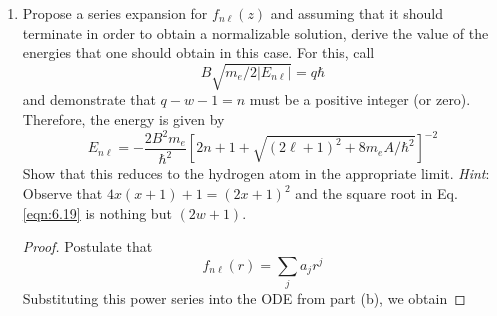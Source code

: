 \documentclass[../psets.tex]{subfiles}
\begin{document}
\begin{enumerate}
\begin{enumerate}
\begin{proof}
\begin{align*}
\begin{split}
                    & -\frac{2m_e}{\hbar^2}\left[ -\frac{B}{r}+\frac{\hbar^2w(w+1)}{2m_er^2}-E_{n\ell} \right]f_{n\ell}(r)
                \end{split}\\
                \begin{split}
                    ={}& f_{n\ell}''(r)+\left[ \frac{2(w+1)}{r}-2k_{n\ell} \right]f_{n\ell}'(r)+\left[ -\frac{2k_{n\ell}(w+1)}{r}+k_{n\ell}^2 \right]f_{n\ell}(r)\\
                    & +\frac{2m_e}{\hbar^2}\left[ \frac{B}{r}+E_{n\ell} \right]f_{n\ell}(r)
                \end{split}\\
                ={}& f_{n\ell}''(r)+2\left[ \frac{w+1}{r}-k_{n\ell} \right]f_{n\ell}'(r)+\left[ \frac{2m_eB}{\hbar^2r}-\frac{2k_{n\ell}(w+1)}{r}+\frac{2m_eE_{n\ell}}{\hbar^2}+k_{n\ell}^2 \right]f_{n\ell}(r)\\
                ={}& f_{n\ell}''(r)+2\left[ \frac{w+1}{r}-k_{n\ell} \right]f_{n\ell}'(r)+2\left[ \frac{m_eB}{\hbar^2r}-\frac{k_{n\ell}(w+1)}{r} \right]f_{n\ell}(r)
            \end{align*}
            \endgroup
        \end{proof}
        \item Propose a series expansion for $f_{n\ell}(z)$ and assuming that it should terminate in order to obtain a normalizable solution, derive the value of the energies that one should obtain in this case. For this, call
        \begin{equation}\label{eqn:6.18}
            B\sqrt{m_e/2|E_{n\ell}|} = q\hbar
        \end{equation}
        and demonstrate that $q-w-1=n$ must be a positive integer (or zero). Therefore, the energy is given by
        \begin{equation}\label{eqn:6.19}
            E_{n\ell} = -\frac{2B^2m_e}{\hbar^2}\left[ 2n+1+\sqrt{(2\ell+1)^2+8m_eA/\hbar^2} \right]^{-2}
        \end{equation}
        Show that this reduces to the hydrogen atom in the appropriate limit. \emph{Hint}: Observe that $4x(x+1)+1=(2x+1)^2$ and the square root in Eq. \ref{eqn:6.19} is nothing but $(2w+1)$.
        \begin{proof}
            Postulate that
            \begin{equation*}
                f_{n\ell}(r) = \sum_ja_jr^j
            \end{equation*}
            Substituting this power series into the ODE from part (b), we obtain

\end{proof}
\end{enumerate}
\end{enumerate}
\end{document}
